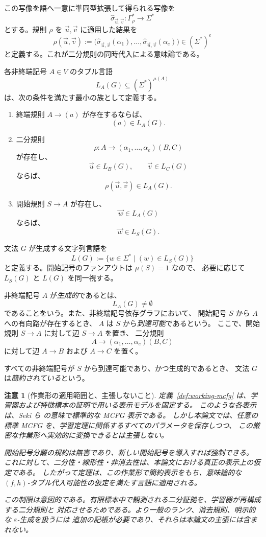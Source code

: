 \documentclass[11pt,a4paper]{ltjsarticle}
\newtheorem{remark}[theorem]{注意}
\theoremstyle{remark}
\newcommand{\tuple}[1]{\vec{#1}}
\newcommand{\eps}{\varepsilon}
\begin{document}
この写像を語へ一意に準同型拡張して得られる写像を
\[
  \widehat{\sigma}_{\tuple u,\tuple v}\colon
  \Gamma_\rho^*\to\Sigma^*
\]
とする。規則 \(\rho\) を
\(\tuple u,\tuple v\) に適用した結果を
\[
  \rho(\tuple u,\tuple v)
  :=
  \bigl(
    \widehat{\sigma}_{\tuple u,\tuple v}(\alpha_1),
    \ldots,
    \widehat{\sigma}_{\tuple u,\tuple v}(\alpha_e)
  \bigr)
  \in(\Sigma^*)^e
\]
と定義する。これが二分規則の同時代入による意味論である。

各非終端記号 \(A\in V\) のタプル言語
\[
  L_A(G)\subseteq(\Sigma^*)^{\mu(A)}
\]
は、次の条件を満たす最小の族として定義する。
\begin{enumerate}[label=(\roman*),leftmargin=*]
\item 終端規則 \(A\to(a)\) が存在するならば、
      \[
        (a)\in L_A(G).
      \]

\item 二分規則
      \[
        \rho\colon
        A\to(\alpha_1,\ldots,\alpha_e)(B,C)
      \]
      が存在し、
      \[
        \tuple u\in L_B(G),
        \qquad
        \tuple v\in L_C(G)
      \]
      ならば、
      \[
        \rho(\tuple u,\tuple v)\in L_A(G).
      \]

\item 開始規則 \(S\to A\) が存在し、
      \[
        \tuple w\in L_A(G)
      \]
      ならば、
      \[
        \tuple w\in L_S(G).
      \]
\end{enumerate}
文法 \(G\) が生成する文字列言語を
\[
  L(G):=
  \{w\in\Sigma^*\mid (w)\in L_S(G)\}
\]
と定義する。開始記号のファンアウトは \(\mu(S)=1\) なので、
必要に応じて \(L_S(G)\) と \(L(G)\) を同一視する。

非終端記号 \(A\) が\emph{生成的}であるとは、
\[
  L_A(G)\ne\emptyset
\]
であることをいう。また、非終端記号依存グラフにおいて、
開始記号 \(S\) から \(A\) への有向路が存在するとき、
\(A\) は \(S\) から\emph{到達可能}であるという。
ここで、開始規則 \(S\to A\) に対して辺 \(S\to A\) を置き、
二分規則
\[
  A\to(\alpha_1,\ldots,\alpha_e)(B,C)
\]
に対して辺 \(A\to B\) および \(A\to C\) を置く。

すべての非終端記号が \(S\) から到達可能であり、かつ生成的であるとき、
文法 \(G\) は\emph{簡約されている}という。

\begin{remark}[作業形の適用範囲と、主張しないこと]
\label{rem:working-form-scope}
定義~\ref{def:working-mcfg} は、学習器および特徴標本の証明で用いる表示モデルを固定する。
このような各表示は、Seki ら \cite{SekiEtAl1991} の意味で標準的な MCFG 表示である。
しかし本論文では、任意の標準 MCFG を、学習定理に関係するすべてのパラメータを保存しつつ、
この厳密な作業形へ実効的に変換できるとは主張しない。

開始記号分離の規約は無害であり、新しい開始記号を導入すれば強制できる。
これに対して、二分性・線形性・非消去性は、本論文における真正の表示上の仮定である。
したがって定理は、この作業形で簡約表示をもち、意味論的な
\((f,h)\)-タプル代入可能性の仮定を満たす言語に適用される。

この制限は意図的である。有限標本中で観測される二分証拠を、学習器が再構成する二分規則と
対応させるためである。より一般のランク、消去規則、明示的な \(\eps\)-生成を扱うには
追加の記帳が必要であり、それらは本論文の主張には含まれない。
\end{remark}
\end{document}
